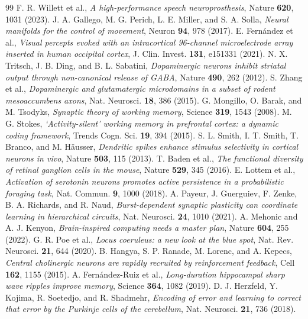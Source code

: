 \begin{thebibliography}{99}
 F. R. Willett et al., \emph{A high-performance speech neuroprosthesis}, Nature \textbf{620}, 1031 (2023).
 J. A. Gallego, M. G. Perich, L. E. Miller, and S. A. Solla, \emph{Neural manifolds for the control of movement}, Neuron \textbf{94}, 978 (2017).
 E. Fern\'andez et al., \emph{Visual percepts evoked with an intracortical 96-channel microelectrode array inserted in human occipital cortex}, J. Clin. Invest. \textbf{131}, e151331 (2021).
 N. X. Tritsch, J. B. Ding, and B. L. Sabatini, \emph{Dopaminergic neurons inhibit striatal output through non-canonical release of GABA}, Nature \textbf{490}, 262 (2012).
 S. Zhang et al., \emph{Dopaminergic and glutamatergic microdomains in a subset of rodent mesoaccumbens axons}, Nat. Neurosci. \textbf{18}, 386 (2015).
 G. Mongillo, O. Barak, and M. Tsodyks, \emph{Synaptic theory of working memory}, Science \textbf{319}, 1543 (2008).
 M. G. Stokes, \emph{`Activity-silent' working memory in prefrontal cortex: a dynamic coding framework}, Trends Cogn. Sci. \textbf{19}, 394 (2015).
 S. L. Smith, I. T. Smith, T. Branco, and M. H\"ausser, \emph{Dendritic spikes enhance stimulus selectivity in cortical neurons in vivo}, Nature \textbf{503}, 115 (2013).
 T. Baden et al., \emph{The functional diversity of retinal ganglion cells in the mouse}, Nature \textbf{529}, 345 (2016).
 E. Lottem et al., \emph{Activation of serotonin neurons promotes active persistence in a probabilistic foraging task}, Nat. Commun. \textbf{9}, 1000 (2018).
 A. Payeur, J. Guerguiev, F. Zenke, B. A. Richards, and R. Naud, \emph{Burst-dependent synaptic plasticity can coordinate learning in hierarchical circuits}, Nat. Neurosci. \textbf{24}, 1010 (2021).
 A. Mehonic and A. J. Kenyon, \emph{Brain-inspired computing needs a master plan}, Nature \textbf{604}, 255 (2022).
 G. R. Poe et al., \emph{Locus coeruleus: a new look at the blue spot}, Nat. Rev. Neurosci. \textbf{21}, 644 (2020).
 B. Hangya, S. P. Ranade, M. Lorenc, and A. Kepecs, \emph{Central cholinergic neurons are rapidly recruited by reinforcement feedback}, Cell \textbf{162}, 1155 (2015).
 A. Fern\'andez-Ruiz et al., \emph{Long-duration hippocampal sharp wave ripples improve memory}, Science \textbf{364}, 1082 (2019).
 D. J. Herzfeld, Y. Kojima, R. Soetedjo, and R. Shadmehr, \emph{Encoding of error and learning to correct that error by the Purkinje cells of the cerebellum}, Nat. Neurosci. \textbf{21}, 736 (2018).

\end{thebibliography}
